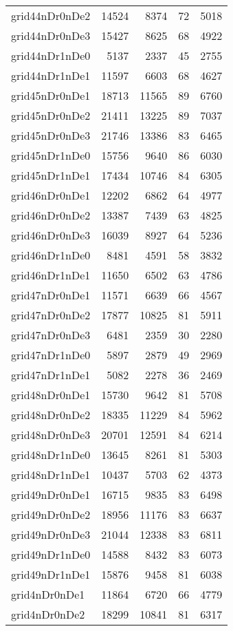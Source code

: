\begin{longtable}{lrrrr}
grid44nDr0nDe2 & 14524 & 8374 & 72 & 5018 \\
grid44nDr0nDe3 & 15427 & 8625 & 68 & 4922 \\
grid44nDr1nDe0 & 5137 & 2337 & 45 & 2755 \\
grid44nDr1nDe1 & 11597 & 6603 & 68 & 4627 \\
grid45nDr0nDe1 & 18713 & 11565 & 89 & 6760 \\
grid45nDr0nDe2 & 21411 & 13225 & 89 & 7037 \\
grid45nDr0nDe3 & 21746 & 13386 & 83 & 6465 \\
grid45nDr1nDe0 & 15756 & 9640 & 86 & 6030 \\
grid45nDr1nDe1 & 17434 & 10746 & 84 & 6305 \\
grid46nDr0nDe1 & 12202 & 6862 & 64 & 4977 \\
grid46nDr0nDe2 & 13387 & 7439 & 63 & 4825 \\
grid46nDr0nDe3 & 16039 & 8927 & 64 & 5236 \\
grid46nDr1nDe0 & 8481 & 4591 & 58 & 3832 \\
grid46nDr1nDe1 & 11650 & 6502 & 63 & 4786 \\
grid47nDr0nDe1 & 11571 & 6639 & 66 & 4567 \\
grid47nDr0nDe2 & 17877 & 10825 & 81 & 5911 \\
grid47nDr0nDe3 & 6481 & 2359 & 30 & 2280 \\
grid47nDr1nDe0 & 5897 & 2879 & 49 & 2969 \\
grid47nDr1nDe1 & 5082 & 2278 & 36 & 2469 \\
grid48nDr0nDe1 & 15730 & 9642 & 81 & 5708 \\
grid48nDr0nDe2 & 18335 & 11229 & 84 & 5962 \\
grid48nDr0nDe3 & 20701 & 12591 & 84 & 6214 \\
grid48nDr1nDe0 & 13645 & 8261 & 81 & 5303 \\
grid48nDr1nDe1 & 10437 & 5703 & 62 & 4373 \\
grid49nDr0nDe1 & 16715 & 9835 & 83 & 6498 \\
grid49nDr0nDe2 & 18956 & 11176 & 83 & 6637 \\
grid49nDr0nDe3 & 21044 & 12338 & 83 & 6811 \\
grid49nDr1nDe0 & 14588 & 8432 & 83 & 6073 \\
grid49nDr1nDe1 & 15876 & 9458 & 81 & 6038 \\
grid4nDr0nDe1 & 11864 & 6720 & 66 & 4779 \\
grid4nDr0nDe2 & 18299 & 10841 & 81 & 6317 \\

\end{longtable}
